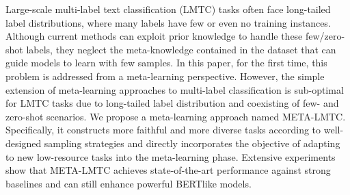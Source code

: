 Large-scale multi-label text classification (LMTC) tasks often face long-tailed label distributions, where many labels have few or even no training instances. Although current methods can exploit prior knowledge to handle these few/zero-shot labels, they neglect the meta-knowledge contained in the dataset that can guide models to learn with few samples. In this paper, for the first time, this problem is addressed from a meta-learning perspective. However, the simple extension of meta-learning approaches to multi-label classification is sub-optimal for LMTC tasks due to long-tailed label distribution and coexisting of few- and zero-shot scenarios. We propose a meta-learning approach named META-LMTC. Specifically, it constructs more faithful and more diverse tasks according to well-designed sampling strategies and directly incorporates the objective of adapting to new low-resource tasks into the meta-learning phase. Extensive experiments show that META-LMTC achieves state-of-the-art performance against strong baselines and can still enhance powerful BERTlike models.
